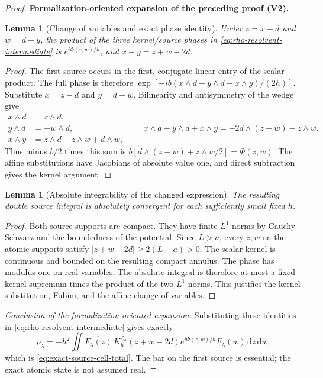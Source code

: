 \documentclass[11pt]{article}
\newtheorem{lemma}[theorem]{Lemma}
\newcommand{\formalisationparentid}{X}
\newenvironment{formalisationaddition}[1]{\par\medskip\begingroup\color{blue}\def\formalisationparentid{#1}\setcounter{formalizationsublemma}{0}\let\lemma\formalizationsublemma\let\endlemma\endformalizationsublemma
  \def\Eo{\mathcal E_h^\circ}\def\EE{\mathcal E_h}\def\phio{\phi_h^\circ}\def\phih{\phi_h}\def\Ho{H_h^{\rm atom}(v^\circ)}\def\Ha{H_h^{\rm atom}}\def\HL{H_h^{L}}\def\Dh{D_h}\def\Log{\operatorname{Log}}\def\ellh{\ell_h}\def\Gp{G_{p,h}}\def\Ast{A_{*,h}}\def\ahat{\widehat{\mathfrak a}_h}\def\ah{\mathfrak a_h}\def\rh{\widehat\rho_h}\def\deltah{\widehat\delta_h}\def\oldref##1{\textup{(##1)}}\def\interface##1{\par\noindent\textit{Analytical interface used here.} ##1\par}\def\finish{\par\noindent\textit{Conclusion of the formalization-oriented expansion.} }\par\noindent\textbf{Formalization-oriented expansion of the preceding proof (V2).}\par\smallskip
}{\par\endgroup\medskip
}
\begin{document}
\begin{proof}
\begin{formalisationaddition}{P5.1}
\begin{lemma}[Change of variables and exact phase identity]\label{sublemma:P5-1-wedge-phase}
Under $z=x+d$ and $w=d-y$, the product of the three kernel/source phases in \eqref{eq:rho-resolvent-intermediate} is $e^{i\Phi(z,w)/h}$, and $x-y=z+w-2d$.
\end{lemma}
\begin{proof}
The first source occurs in the first, conjugate-linear entry of the scalar product. The full phase is therefore
$\exp[-ib(x\wedge d+y\wedge d+x\wedge y)/(2h)]$.
Substitute $x=z-d$ and $y=d-w$. Bilinearity and antisymmetry of the wedge give
\[
 \begin{split}
 x\wedge d&=z\wedge d,\\
 y\wedge d&=-w\wedge d,\\
 x\wedge y&=z\wedge d-z\wedge w+d\wedge w,
 \end{split}
 \qquad
 x\wedge d+y\wedge d+x\wedge y
 =-2d\wedge(z-w)-z\wedge w.
\]
Thus minus $b/2$ times this sum is $b[d\wedge(z-w)+z\wedge w/2]=\Phi(z,w)$. The affine substitutions have Jacobians of absolute value one, and direct subtraction gives the kernel argument.
\end{proof}

\begin{lemma}[Absolute integrability of the changed expression]\label{sublemma:P5-1-fubini}
The resulting double source integral is absolutely convergent for each sufficiently small fixed $h$.
\end{lemma}
\begin{proof}
Both source supports are compact. They have finite $L^1$ norms by Cauchy--Schwarz and the boundedness of the potential. Since $L>a$, every $z,w$ on the atomic supports satisfy
$|z+w-2d|\ge2(L-a)>0$. The scalar kernel is continuous and bounded on the resulting compact annulus. The phase has modulus one on real variables. The absolute integral is therefore at most a fixed kernel supremum times the product of the two $L^1$ norms. This justifies the kernel substitution, Fubini, and the affine change of variables.
\end{proof}
\finish Substituting these identities in \eqref{eq:rho-resolvent-intermediate} gives exactly
\[
 \rho_\lambda=-h^2\iint\overline{F_\lambda(z)}\,
 K_h^{\mathcal E_h}(z+w-2d)e^{i\Phi(z,w)/h}F_\lambda(w)\,\mathrm dz\,\mathrm dw,
\]
which is \eqref{eq:exact-source-cell-total}. The bar on the first source is essential; the exact atomic state is not assumed real.
\end{formalisationaddition}

\end{proof}
\end{document}
